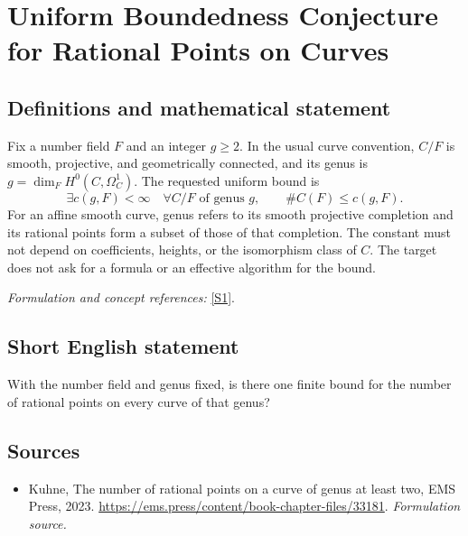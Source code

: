 \documentclass[11pt]{article}
\begin{document}
\section*{\texorpdfstring{Uniform Boundedness Conjecture for Rational Points on Curves}{Uniform Boundedness Conjecture for Rational Points on Curves}}\label{164}
\subsection{Definitions and mathematical statement}
Fix a number field $F$ and an integer $g\ge2$. In the usual curve convention, $C/F$ is smooth, projective, and geometrically connected, and its genus is $g=\dim_F H^0(C,\Omega_C^1)$. The requested uniform bound is
\[
 \exists c(g,F)<\infty\quad\forall C/F\text{ of genus }g,
 \qquad\#C(F)\le c(g,F).
\]
For an affine smooth curve, genus refers to its smooth projective completion and its rational points form a subset of those of that completion. The constant must not depend on coefficients, heights, or the isomorphism class of $C$. The target does not ask for a formula or an effective algorithm for the bound.
\par\smallskip\textit{Formulation and concept references:} \href{https://ems.press/content/book-chapter-files/33181}{[S1]}.

\subsection{Short English statement}
With the number field and genus fixed, is there one finite bound for the number of rational points on every curve of that genus?
\subsection{Sources}
\begin{itemize}
\item[S1]Kuhne, The number of rational points on a curve of genus at least two, EMS Press, 2023.
\url{https://ems.press/content/book-chapter-files/33181}.
\textit{Formulation source.}
\end{itemize}
\end{document}

